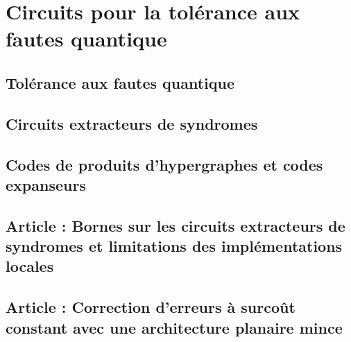 \begin{comment}
\end{comment}

\chapter{Circuits pour la tolérance aux fautes quantique}

\section{Tolérance aux fautes quantique}

\section{Circuits extracteurs de syndromes}

\section{Codes de produits d'hypergraphes et codes expanseurs}

\section{Article : Bornes sur les circuits extracteurs de syndromes et limitations des implémentations locales}

% 

\section{Article : Correction d'erreurs à surcoût constant avec une architecture planaire mince}

% 


